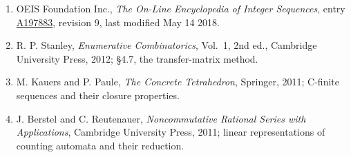 \documentclass[11pt]{article}
\theoremstyle{definition}
\begin{document}
\begin{enumerate}

\item OEIS Foundation Inc., \emph{The On-Line Encyclopedia of Integer Sequences}, entry \href{https://oeis.org/A197883}{A197883}, revision 9, last modified May 14 2018.

\item R. P. Stanley, \emph{Enumerative Combinatorics}, Vol.~1, 2nd ed., Cambridge University Press, 2012; \S4.7, the transfer-matrix method.

\item M. Kauers and P. Paule, \emph{The Concrete Tetrahedron}, Springer, 2011; C-finite sequences and their closure properties.

\item J. Berstel and C. Reutenauer, \emph{Noncommutative Rational Series with Applications}, Cambridge University Press, 2011; linear representations of counting automata and their reduction.

\end{enumerate}
\end{document}
